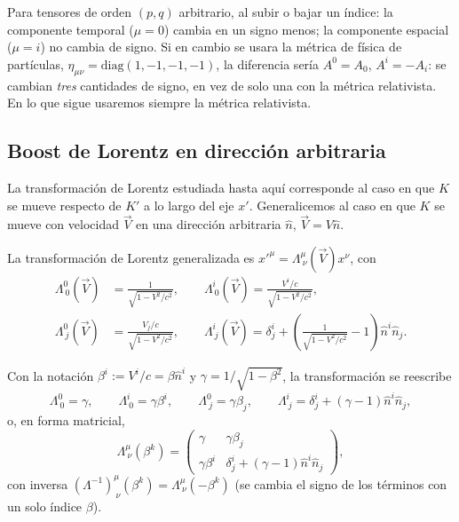 \begin{observacion}
Para tensores de orden $(p,q)$ arbitrario, al subir o bajar un índice:
la componente temporal ($\mu=0$) cambia en un signo menos; la componente
espacial ($\mu=i$) no cambia de signo. Si en cambio se usara la métrica
de física de partículas, $\eta_{\mu\nu}=\text{diag}(1,-1,-1,-1)$, la
diferencia sería $A^0=A_0$, $A^i=-A_i$: se cambian \emph{tres}
cantidades de signo, en vez de solo una con la métrica relativista. En
lo que sigue usaremos siempre la métrica relativista.
\end{observacion}

\subsection{Boost de Lorentz en dirección arbitraria}

La transformación de Lorentz estudiada hasta aquí corresponde al caso en
que $K$ se mueve respecto de $K'$ a lo largo del eje $x'$. Generalicemos
al caso en que $K$ se mueve con velocidad $\vec V$ en una dirección
arbitraria $\hat n$, $\vec V=V\hat n$.

\begin{definicion}
La transformación de Lorentz generalizada es $x'^\mu=\Lambda^\mu_{\
\nu}(\vec V)x^\nu$, con
\begin{align*}
\Lambda^0_{\ 0}(\vec V) &= \frac{1}{\sqrt{1-V^2/c^2}}, \qquad
\Lambda^i_{\ 0}(\vec V) = \frac{V^i/c}{\sqrt{1-V^2/c^2}}, \\
\Lambda^0_{\ j}(\vec V) &= \frac{V_j/c}{\sqrt{1-V^2/c^2}}, \qquad
\Lambda^i_{\ j}(\vec V) = \delta^i_j + \left(\frac{1}{\sqrt{1-V^2/c^2}}
-1\right)\hat n^i\hat n_j .
\end{align*}
\end{definicion}

Con la notación $\beta^i:=V^i/c=\beta\hat n^i$ y
$\gamma=1/\sqrt{1-\beta^2}$, la transformación se reescribe
\[
\Lambda^0_{\ 0}=\gamma, \qquad \Lambda^i_{\ 0}=\gamma\beta^i, \qquad
\Lambda^0_{\ j}=\gamma\beta_j, \qquad \Lambda^i_{\ j} = \delta^i_j+
(\gamma-1)\hat n^i\hat n_j, \tag{52}
\]
o, en forma matricial,
\[
\Lambda^\mu_{\ \nu}(\beta^k) = \begin{pmatrix} \gamma & \gamma\beta_j
\\ \gamma\beta^i & \delta^i_j+(\gamma-1)\hat n^i\hat n_j \end{pmatrix},
\tag{53}
\]
con inversa $(\Lambda^{-1})^\mu_{\ \nu}(\beta^k) = \Lambda^\mu_{\
\nu}(-\beta^k)$ (se cambia el signo de los términos con un solo índice
$\beta$).

